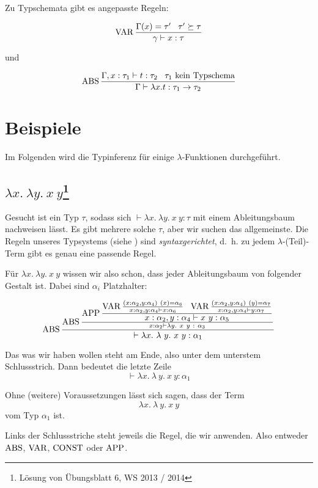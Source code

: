 Zu Typschemata gibt es angepasste Regeln:%

\[\operatorname{VAR} \frac{\Gamma(x)= \tau' \;\;\; \tau' \succeq \tau}{\gamma \vdash x: \tau}\]

und

\[\operatorname{ABS} \frac{\Gamma, x: \tau_1 \vdash t: \tau_2 \;\;\; \tau_1 \text{ kein Typschema}}{\Gamma \vdash  \lambda x. t: \tau_1 \rightarrow \tau_2}\]


\section{Beispiele}
Im Folgenden wird die Typinferenz für einige $\lambda$-Funktionen durchgeführt.

\subsection[$\lambda x.\ \lambda y.\ x\ y$]{$\lambda x.\ \lambda y.\ x\ y$\footnote{Lösung von Übungsblatt 6, WS 2013 / 2014}}
Gesucht ist ein Typ $\tau$, sodass sich $\vdash \lambda x.\ \lambda y.\ x\ y: \tau$
mit einem Ableitungsbaum nachweisen lässt. Es gibt mehrere solche $\tau$, aber
wir suchen das allgemeinste. Die Regeln unseres Typsystems (siehe )
sind \textit{syntaxgerichtet}, d.~h. zu jedem $\lambda$-(Teil)-Term gibt es genau
eine passende Regel.

Für $\lambda x.\ \lambda y.\ x\ y$ wissen wir also schon, dass jeder Ableitungsbaum
von folgender Gestalt ist. Dabei sind $\alpha_i$ Platzhalter:

\[\ABS \frac{\ABS\frac{\textstyle\APP \frac{\textstyle\VAR \frac{(x: \alpha_2, y: \alpha_4)\ (x) = \alpha_6}{x: \alpha_2, y: \alpha_4 \vdash x: \alpha_6}\ \ \VAR \frac{(x:\alpha_2, y: \alpha_4)\ (y) = \alpha_7}{x: \alpha_2, y: \alpha_4 \vdash y : \alpha_7}}{\textstyle x: \alpha_2, y: \alpha_4 \vdash x\ y: \alpha_5}}{x:\alpha_2 \vdash \lambda y.\ x\ y\ :\ \alpha_3}}{\vdash \lambda x.\ \lambda \ y.\ x\ y: \alpha_1}\]

Das was wir haben wollen steht am Ende, also unter dem unterstem Schlussstrich.
Dann bedeutet die letzte Zeile
\[\vdash \lambda x.\ \lambda \ y.\ x\ y: \alpha_1\]

Ohne (weitere) Voraussetzungen lässt sich sagen, dass der Term
\[\lambda x.\ \lambda \ y.\ x\ y\]
vom Typ $\alpha_1$ ist.

Links der Schlussstriche steht jeweils die Regel, die wir anwenden. Also entweder
$\operatorname{ABS}$, $\operatorname{VAR}$, $\operatorname{CONST}$ oder $\operatorname{APP}$.

